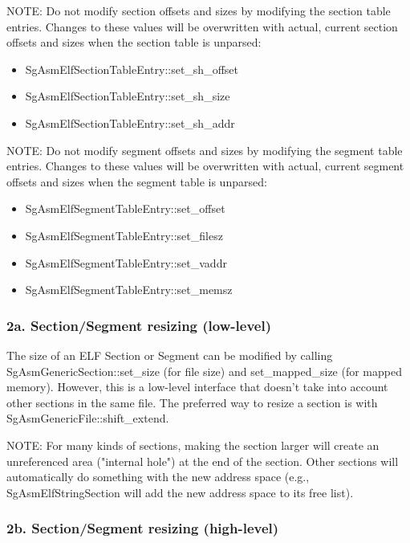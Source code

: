   NOTE: Do not modify section offsets and sizes by modifying the section table entries. Changes to these values will be
   overwritten with actual, current section offsets and sizes when the section table is unparsed:
\begin{itemize}
	\item SgAsmElfSectionTableEntry::set\_sh\_offset
	\item SgAsmElfSectionTableEntry::set\_sh\_size
	\item SgAsmElfSectionTableEntry::set\_sh\_addr
\end{itemize}

   NOTE: Do not modify segment offsets and sizes by modifying the segment table entries. Changes to these values will be
   overwritten with actual, current segment offsets and sizes when the segment table is unparsed:
\begin{itemize}
   \item SgAsmElfSegmentTableEntry::set\_offset
   \item SgAsmElfSegmentTableEntry::set\_filesz
   \item SgAsmElfSegmentTableEntry::set\_vaddr
   \item SgAsmElfSegmentTableEntry::set\_memsz
\end{itemize}

\subsubsection{2a. Section/Segment resizing (low-level)}

   The size of an ELF Section or Segment can be modified by calling SgAsmGenericSection::set\_size (for file size) and
   set\_mapped\_size (for mapped memory). However, this is a low-level interface that doesn't take into account other sections in
   the same file.  The preferred way to resize a section is with SgAsmGenericFile::shift\_extend.

   NOTE: For many kinds of sections, making the section larger will create an unreferenced area ("internal hole") at the end of
   the section. Other sections will automatically do something with the new address space (e.g., SgAsmElfStringSection will
   add the new address space to its free list).

\subsubsection{2b. Section/Segment resizing (high-level)}

